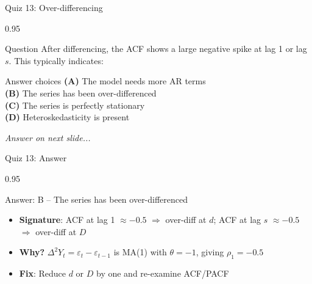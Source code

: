 \documentclass[9pt, aspectratio=169, t]{beamer}
\begin{document}
\begin{frame}{Quiz 13: Over-differencing}
    \begin{cminipage}{0.95\textwidth}
    \begin{alertblock}{Question}
        After differencing, the ACF shows a large negative spike at lag 1 or lag $s$. This typically indicates:
    \end{alertblock}

    \vspace{0.4cm}

    \begin{block}{Answer choices}
        \textcolor{MainBlue}{\textbf{(A)}} The model needs more AR terms\\[3pt]
        \textcolor{MainBlue}{\textbf{(B)}} The series has been over-differenced\\[3pt]
        \textcolor{MainBlue}{\textbf{(C)}} The series is perfectly stationary\\[3pt]
        \textcolor{MainBlue}{\textbf{(D)}} Heteroskedasticity is present
    \end{block}

    \vspace{0.5cm}

    \begin{center}
        \textit{Answer on next slide...}
    \end{center}
    \end{cminipage}
\end{frame}

\begin{frame}{Quiz 13: Answer}
    \begin{cminipage}{0.95\textwidth}
    \begin{exampleblock}{Answer: B -- The series has been over-differenced}
        \begin{itemize}
            \item \textbf{Signature}: ACF at lag 1 $\approx -0.5$ $\Rightarrow$ over-diff at $d$; ACF at lag $s$ $\approx -0.5$ $\Rightarrow$ over-diff at $D$
            \item \textbf{Why?} $\Delta^2 Y_t = \varepsilon_t - \varepsilon_{t-1}$ is MA(1) with $\theta = -1$, giving $\rho_1 = -0.5$
            \item \textbf{Fix}: Reduce $d$ or $D$ by one and re-examine ACF/PACF
        \end{itemize}
    \end{exampleblock}

    \end{cminipage}
\end{frame}
\end{document}
